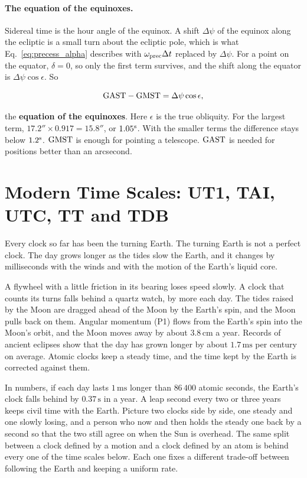 \paragraph{The equation of the equinoxes.} Sidereal time is the hour angle of the equinox. A shift $\Delta\psi$ of the equinox along the ecliptic is a small turn about the ecliptic pole, which is what Eq.~\eqref{eq:precess_alpha} describes with $\omega_{\rm prec}\Delta t$ replaced by $\Delta\psi$. For a point on the equator, $\delta=0$, so only the first term survives, and the shift along the equator is $\Delta\psi\cos\epsilon$. So
\begin{keyresult}
	\begin{equation}
		\mathrm{GAST} - \mathrm{GMST} = \Delta\psi\cos\epsilon,
		\label{eq:equation_of_equinoxes}
	\end{equation}
\end{keyresult}
the \textbf{equation of the equinoxes}. Here $\epsilon$ is the true obliquity. For the largest term, $17.2''\times0.917=15.8''$, or $1.05^{\rm s}$. With the smaller terms the difference stays below $1.2^{\rm s}$. $\mathrm{GMST}$ is enough for pointing a telescope. $\mathrm{GAST}$ is needed for positions better than an arcsecond.

\section{Modern Time Scales: UT1, TAI, UTC, TT and TDB}
\label{ti:sec:timescales}

Every clock so far has been the turning Earth. The turning Earth is not a perfect clock. The day grows longer as the tides slow the Earth, and it changes by milliseconds with the winds and with the motion of the Earth's liquid core.

A flywheel with a little friction in its bearing loses speed slowly. A clock that counts its turns falls behind a quartz watch, by more each day. The tides raised by the Moon are dragged ahead of the Moon by the Earth's spin, and the Moon pulls back on them. Angular momentum (P1) flows from the Earth's spin into the Moon's orbit, and the Moon moves away by about $3.8\,\mathrm{cm}$ a year. Records of ancient eclipses show that the day has grown longer by about $1.7\,\mathrm{ms}$ per century on average. Atomic clocks keep a steady time, and the time kept by the Earth is corrected against them.

In numbers, if each day lasts $1\,\mathrm{ms}$ longer than $86\,400$ atomic seconds, the Earth's clock falls behind by $0.37\,\mathrm s$ in a year. A leap second every two or three years keeps civil time with the Earth. Picture two clocks side by side, one steady and one slowly losing, and a person who now and then holds the steady one back by a second so that the two still agree on when the Sun is overhead. The same split between a clock defined by a motion and a clock defined by an atom is behind every one of the time scales below. Each one fixes a different trade-off between following the Earth and keeping a uniform rate.

